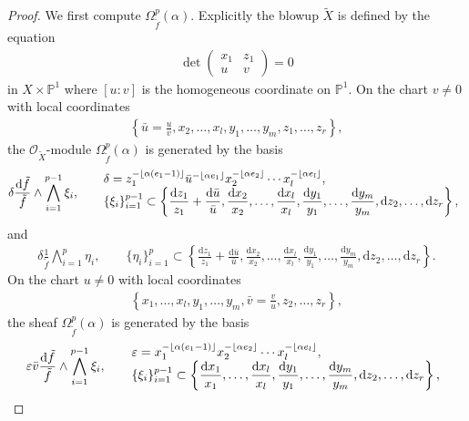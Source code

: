\documentclass[11pt]{article}
\newcommand{\PP}{\mathbb{P}}
\newcommand{\sO}{\mathscr{O}}
\newcommand{\de}{\mathrm{d}}
\newcommand{\flr}[1]{\lfloor #1 \rfloor}
\begin{document}
\begin{proof}
We first compute $\Omega_{\tilde{f}}^p(\alpha)$. Explicitly the blowup $\widetilde{X}$ is defined by the equation
\begin{gather*} \det \begin{pmatrix}
x_1 & z_1 \\
u & v
\end{pmatrix}
= 0 \end{gather*}
in $X\times\PP^1$ where $[u:v]$ is the homogeneous coordinate on $\PP^1$. On the chart $v\neq 0$ with local coordinates
\begin{gather*} \left\{ \bar{u} = \frac{u}{v},x_2,\dots, x_l, y_1, \dots, y_m,z_1, \dots, z_r \right\}, \end{gather*}
the $\sO_{\widetilde{X}}$-module $\Omega_{\tilde{f}}^p(\alpha)$ is generated by the basis
\begin{gather}\label{eq:chart-u-1}
\delta\frac{\de \tilde{f}}{\tilde{f}}\wedge\bigwedge_{i=1}^{p-1}\xi_i,
\qquad\begin{array}{@{}l}
\delta = z_1^{-\flr{\alpha(e_1-1)}}\bar{u}^{-\flr{\alpha e_1}}	x_2^{-\flr{\alpha e_2}}\cdots x_l^{-\flr{\alpha e_l}}, \\
\displaystyle \{\xi_i \}_{i=1}^{p-1} \subset \left\{ \frac{\de z_1}{z_1} + \frac{\de\bar{u}}{\bar{u}},\frac{\de x_2}{x_2},\dots, \frac{\de x_l}{x_l},\frac{\de y_1}{y_1},\dots, \frac{\de y_m}{y_m}, \de z_2,\dots, \de z_r \right\},
\end{array}
\end{gather}
and
\begin{gather}\label{eq:chart-u-2}
\delta\frac{1}{\tilde{f}}\bigwedge_{i=1}^p\eta_i,\qquad
\{\eta_i \}_{i=1}^p \subset\left\{ \frac{\de z_1}{z_1} + \frac{\de\bar{u}}{\bar{u}},\frac{\de x_2}{x_2},\dots, \frac{\de x_l}{x_l},\frac{\de y_1}{y_1},\dots, \frac{\de y_m}{y_m},\de z_2,\dots, \de z_r \right\}.
\end{gather}
On the chart $u\neq 0$ with local coordinates
\begin{gather*} \left\{
x_1,\dots, x_l, y_1, \dots, y_m, \bar{v} = \frac{v}{u},z_2, \dots, z_r \right\}, \end{gather*}
the sheaf $\Omega_{\tilde{f}}^p(\alpha)$ is generated by the basis
\begin{gather}\label{eq:chart-v-1}
\varepsilon\bar{v}\frac{\de \tilde{f}}{\tilde{f}}\wedge\bigwedge_{i=1}^{p-1}\xi_i,
\qquad\begin{array}{@{}l}
\varepsilon = x_1^{-\flr{\alpha(e_1-1)}}	x_2^{-\flr{\alpha e_2}}\cdots x_l^{-\flr{\alpha e_l}}, \\
\displaystyle\{\xi_i \}_{i=1}^{p-1} \subset \left\{ \frac{\de x_1}{x_1},\dots, \frac{\de x_l}{x_l},\frac{\de y_1}{y_1},\dots, \frac{\de y_m}{y_m},\de z_2,\dots, \de z_r \right\},

\end{array}
\end{gather}
\end{proof}
\end{document}
